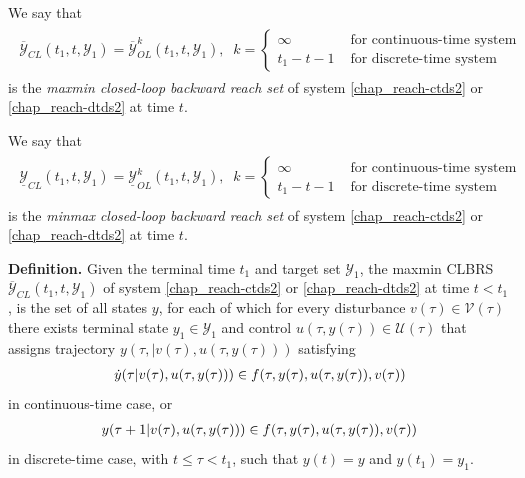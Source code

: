 \documentclass[letterpaper,10pt,english]{sphinxmanual}
\begin{document}
We say that
\label{chap_reach:equation-maxminclbrs}\begin{gather}
\begin{split}\overline{{\mathcal Y}}_{CL}(t_1, t, {\mathcal Y}_1) = \overline{{\mathcal Y}}_{OL}^k(t_1, t, {\mathcal Y}_1), \;\;
k = \left\{\begin{array}{ll}
\infty & \mbox{ for continuous-time system}\\
t_1-t-1 & \mbox{ for discrete-time system}\end{array}\right.\end{split}\label{chap_reach-maxminclbrs}
\end{gather}
is the \emph{maxmin closed-loop backward reach set} of system \eqref{chap_reach-ctds2} or
\eqref{chap_reach-dtds2} at time \(t\).

We say that
\label{chap_reach:equation-minmaxclbrs}\begin{gather}
\begin{split}\underline{{\mathcal Y}}_{CL}(t_1, t, {\mathcal Y}_1) = \underline{{\mathcal Y}}_{OL}^k(t_1, t, {\mathcal Y}_1), \;\;
k = \left\{\begin{array}{ll}
\infty & \mbox{ for continuous-time system}\\
t_1-t-1 & \mbox{ for discrete-time system}\end{array}\right.\end{split}\label{chap_reach-minmaxclbrs}
\end{gather}
is the \emph{minmax closed-loop backward reach set} of system \eqref{chap_reach-ctds2} or
\eqref{chap_reach-dtds2} at time \(t\).

\textbf{Definition.} Given the terminal time \(t_1\) and
target set \({\mathcal Y}_1\), the maxmin CLBRS
\(\overline{{\mathcal Y}}_{CL}(t_1, t, {\mathcal Y}_1)\) of system
\eqref{chap_reach-ctds2} or \eqref{chap_reach-dtds2} at time \(t<t_1\), is the set of all states
\(y\), for each of which for every disturbance
\(v(\tau)\in{\mathcal V}(\tau)\) there exists terminal state
\(y_1\in{\mathcal Y}_1\) and control
\(u(\tau, y(\tau))\in{\mathcal U}(\tau)\) that assigns trajectory
\(y(\tau, | v(\tau), u(\tau, y(\tau)))\) satisfying
\begin{gather}
\begin{split}\dot{y}(\tau | v(\tau), u(\tau, y(\tau))) \in
f(\tau, y(\tau), u(\tau, y(\tau)), v(\tau))\end{split}\notag
\end{gather}
in continuous-time case, or
\begin{gather}
\begin{split}y(\tau+1 | v(\tau), u(\tau, y(\tau))) \in
f(\tau, y(\tau), u(\tau, y(\tau)), v(\tau))\end{split}\notag
\end{gather}
in discrete-time case, with \(t\leqslant\tau<t_1\), such that
\(y(t) = y\) and \(y(t_1)=y_1\).
\end{document}
